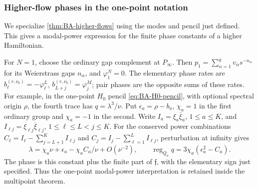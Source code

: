 \subsubsection{Higher-flow phases in the one-point notation}
\label{sec:BA-one-point-higher-flows}

We specialize \cref{thm:BA-higher-flows} using the modes and pencil
just defined. This gives a modal-power expression for the finite
phase constants of a higher Hamiltonian.

For $N=1$, choose the ordinary gap complement at $P_\infty$.
Then $p_1=\sum_{\alpha=1}^{g}v_\alpha s^{-n_\alpha}$ for its
Weierstrass gaps $n_\alpha$, and $\varphi_1^N=0$.
The elementary phase rates are
$b_{\ell}^{(r,\nu_0)}=-\varphi_{\ell}^L$,
$b_{L+j}^{(r,\nu_0)}=\varphi_j^M$; pair phases are the opposite
sums of these rates. For example, in the one-point $H_0$ pencil
\cref{eq:BA-H0-pencil}, with optional spectral origin $\rho$, the
fourth trace has $q=\lambda^3/\nu$. Put $\epsilon_a=\rho-b_a$,
$\chi_a=1$ in the first ordinary group and $\chi_a=-1$ in the second.
Write $I_a=\xi_a\bar\xi_a$, $1\leq a\leq K$, and
$I_{\ell j}=\xi_{\ell j}\bar\xi_{\ell j}$, $1\leq\ell\leq L<j\leq K$.
For the conserved power combinations
$C_{\ell}=I_{\ell}-\sum_{j=L+1}^{K}I_{\ell j}$ and
$C_j=I_j-\sum_{\ell=1}^{L}I_{\ell j}$, perturbation at infinity gives
\[
 \lambda=\chi_a\nu+\epsilon_a-\chi_aC_a/\nu+O(\nu^{-2}),\qquad
 \operatorname{reg}_{Q_a}q=3\chi_a(\epsilon_a^2-C_a).
\]
The phase is this constant plus the finite part of $\mathfrak f$,
with the elementary sign just specified. Thus the one-point
modal-power interpretation is retained inside the multipoint theorem.
